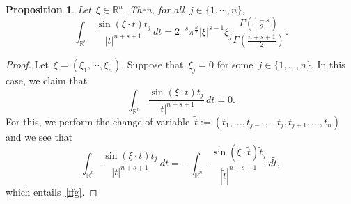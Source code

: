 \documentclass[11pt,hyp,]{nyjm}
\numberwithin{equation}{section}
\newcommand{\R}{\mathbb{R}}
\newtheorem{proposition}[theorem]{Proposition}
\theoremstyle{remark}
\begin{document}
\begin{proposition}\label{fbp}
Let~$\xi\in \R^n$. Then, for all~$j\in\{1,\cdots,n\}$,
\begin{equation}\label{dbd}
\int_{\R^n} \frac{\sin(\xi \cdot t) t_j}{|t|^{n+s+1}} \, dt = 2^{-s}\pi^{\frac{n}{2}} |\xi|^{s-1}\xi_j\frac{\Gamma(\frac{1-s}{2})}{\Gamma(\frac{n+s+1}{2})}.
\end{equation}
\end{proposition}

\begin{proof}
Let~$\xi=(\xi_1,\cdots, \xi_n)$. Suppose that~$\xi_j=0$ for some~$j\in\{1,\dots,n\}$. In this case, we claim that
\begin{equation}\label{ffg}
\int_{\R^n} \frac{\sin(\xi \cdot t) t_j}{|t|^{n+s+1}} \, dt =0.
\end{equation}
For this, we perform the change of variable~$\tilde{t} := (t_1, \ldots, t_{j-1}, -t_j, t_{j+1}, \ldots, t_n)$ and we see that
\begin{equation}
\int_{\R^n} \frac{\sin(\xi \cdot t) t_j}{|t|^{n+s+1}} \, dt = - \int_{\R^n} \frac{\sin(\xi \cdot \tilde{t}) \tilde{t}_j}{|\tilde{t}|^{n+s+1}} \, d\tilde{t},
\end{equation}
which entails~\eqref{ffg}.


\end{proof}
\end{document}
